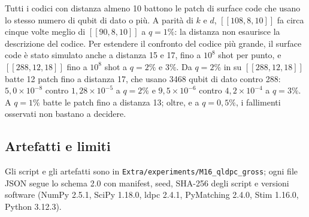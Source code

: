 \begin{onehalfspace}
Tutti i codici con distanza almeno 10 battono le patch di surface code
che usano lo stesso numero di qubit di dato o più. A parità di $k$ e $d$,
$[[108,8,10]]$ fa circa cinque volte meglio di $[[90,8,10]]$ a
$q = 1\%$: la distanza non esaurisce la descrizione del codice. Per
estendere il confronto del codice più grande, il surface code è stato
simulato anche a distanza 15 e 17, fino a $10^8$ shot per punto, e
$[[288,12,18]]$ fino a $10^8$ shot a $q = 2\%$ e $3\%$. Da $q = 2\%$ in su
$[[288,12,18]]$ batte 12 patch fino a distanza 17, che usano 3468 qubit
di dato contro 288: $5{,}0\times10^{-8}$ contro $1{,}28\times10^{-5}$ a
$q = 2\%$ e $9{,}5\times10^{-6}$ contro $4{,}2\times10^{-4}$ a $q = 3\%$.
A $q = 1\%$ batte le patch fino a distanza 13; oltre, e a $q = 0{,}5\%$,
i fallimenti osservati non bastano a decidere.

\subsection{Artefatti e limiti}
\label{app:gross_artefatti}

Gli script e gli artefatti sono in
\texttt{Extra/experiments/M16\_qldpc\_gross}; ogni file JSON segue lo
schema 2.0 con manifest, seed, SHA-256 degli script e versioni software
(NumPy 2.5.1, SciPy 1.18.0, ldpc 2.4.1, PyMatching 2.4.0, Stim 1.16.0,
Python 3.12.3).


\end{onehalfspace}
